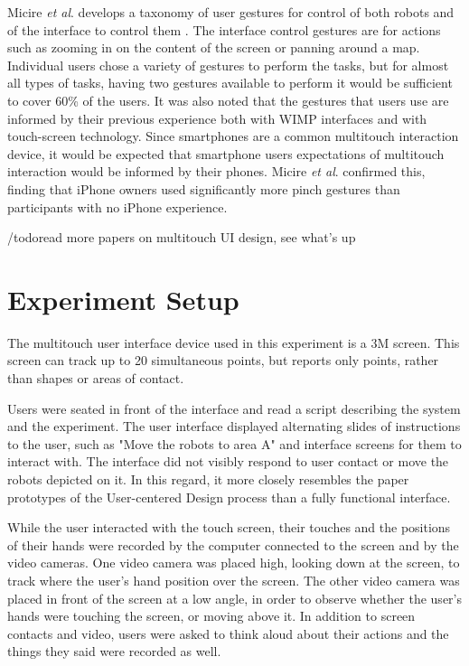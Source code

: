\documentclass[]{article}
\begin{document}
Micire \textit{et al}. develops a taxonomy of user gestures for control of both robots and of the interface to control them \cite{Micire:2009:ANG:1731903.1731912}. 
The interface control gestures are for actions such as zooming in on the content of the screen or panning around a map. 
Individual users chose a variety of gestures to perform the tasks, but for almost all types of tasks, having two gestures available to perform it would be sufficient to cover 60\% of the users. 
It was also noted that the gestures that users use are informed by their previous experience both with WIMP interfaces and with touch-screen technology. 
Since smartphones are a common multitouch interaction device, it would be expected that smartphone users expectations of multitouch interaction would be informed by their phones. 
Micire \textit{et al}. confirmed this, finding that iPhone owners used significantly more pinch gestures than participants with no iPhone experience. 

/todo{read more papers on multitouch UI design, see what's up}

\section{Experiment Setup}


The multitouch user interface device used in this experiment is a 3M  screen. 
This screen can track up to 20 simultaneous points, but reports only points, rather than shapes or areas of contact. 

Users were seated in front of the interface and read a script describing the system and the experiment. The user interface displayed alternating slides of instructions to the user, such as "Move the robots to area A" and interface screens for them to interact with. 
The interface did not visibly respond to user contact or move the robots depicted on it.
In this regard, it more closely resembles the paper prototypes of the User-centered Design process  than a fully functional interface.

While the user interacted with the touch screen, their touches and the positions of their hands were recorded by the computer connected to the screen and by the video cameras. 
One video camera was placed high, looking down at the screen, to track where the user's hand position over the screen. 
The other video camera was placed in front of the screen at a low angle, in order to observe whether the user's hands were touching the screen, or moving above it. 
In addition to screen contacts and video, users were asked to think aloud about their actions and the things they said were recorded as well. 
\end{document}
